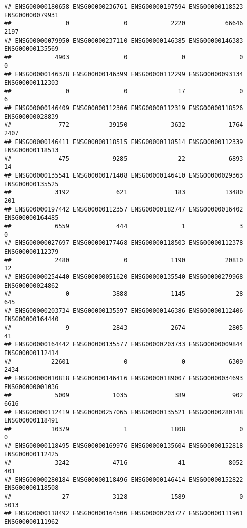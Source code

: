 \documentclass[
]{article}
\begin{document}
\begin{verbatim}
## ENSG00000180658 ENSG00000236761 ENSG00000197594 ENSG00000118523 ENSG00000079931 
##               0               0            2220           66646            2197 
## ENSG00000079950 ENSG00000237110 ENSG00000146385 ENSG00000146383 ENSG00000135569 
##            4903               0               0               0               0 
## ENSG00000146378 ENSG00000146399 ENSG00000112299 ENSG00000093134 ENSG00000112303 
##               0               0              17               0               6 
## ENSG00000146409 ENSG00000112306 ENSG00000112319 ENSG00000118526 ENSG00000028839 
##             772           39150            3632            1764            2407 
## ENSG00000146411 ENSG00000118515 ENSG00000118514 ENSG00000112339 ENSG00000118513 
##             475            9285              22            6893              14 
## ENSG00000135541 ENSG00000171408 ENSG00000146410 ENSG00000029363 ENSG00000135525 
##            3192             621             183           13480             201 
## ENSG00000197442 ENSG00000112357 ENSG00000182747 ENSG00000016402 ENSG00000164485 
##            6559             444               1               3               0 
## ENSG00000027697 ENSG00000177468 ENSG00000118503 ENSG00000112378 ENSG00000112379 
##            2480               0            1190           20810              12 
## ENSG00000254440 ENSG00000051620 ENSG00000135540 ENSG00000279968 ENSG00000024862 
##               0            3888            1145              28             645 
## ENSG00000203734 ENSG00000135597 ENSG00000146386 ENSG00000112406 ENSG00000164440 
##               9            2843            2674            2805              41 
## ENSG00000164442 ENSG00000135577 ENSG00000203733 ENSG00000009844 ENSG00000112414 
##           22601               0               0            6309            2434 
## ENSG00000010818 ENSG00000146416 ENSG00000189007 ENSG00000034693 ENSG00000001036 
##            5009            1035             389             902            6616 
## ENSG00000112419 ENSG00000257065 ENSG00000135521 ENSG00000280148 ENSG00000118491 
##           10379               1            1808               0               0 
## ENSG00000118495 ENSG00000169976 ENSG00000135604 ENSG00000152818 ENSG00000112425 
##            3242            4716              41            8052             401 
## ENSG00000280184 ENSG00000118496 ENSG00000146414 ENSG00000152822 ENSG00000118508 
##              27            3128            1589               0            5013 
## ENSG00000118492 ENSG00000164506 ENSG00000203727 ENSG00000111961 ENSG00000111962 

\end{verbatim}
\end{document}
